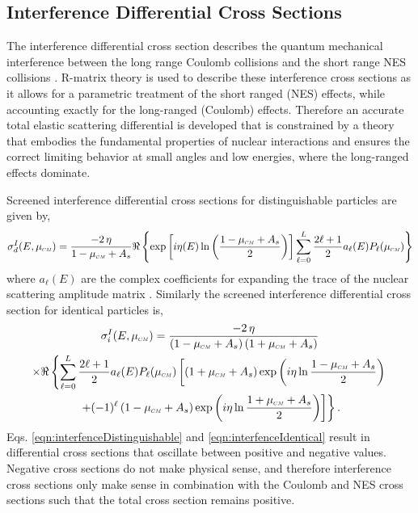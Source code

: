 \subsection{Interference Differential Cross Sections}
The interference differential cross section describes the quantum mechanical interference between the long range Coulomb collisions and the short range NES collisions \cite{Hale-1983}. R-matrix theory is used to describe these interference cross sections as it allows for a parametric treatment of the short ranged (NES) effects, while accounting exactly for the long-ranged (Coulomb) effects. Therefore an accurate total elastic scattering differential is developed that is constrained by a theory that embodies the fundamental properties of nuclear interactions and ensures the correct limiting behavior at small angles and low energies, where the long-ranged effects dominate.

Screened interference differential cross sections for distinguishable particles are given by,
\begin{equation} \label{eqn:interfenceDistinguishable}
    \sigma_d^I(E,\mucm) = \dfrac{-2 \, \eta}{1 - \mucm + A_s} \Re \left\lbrace \exp \left[ i \eta(E) \ln \left( \dfrac{1 - \mucm + A_s}{2} \right) \right]\sum\limits_{\ell = 0}^L \dfrac{2\ell + 1}{2} a_{\ell}(E) P_{\ell}(\mucm) \right\rbrace
\end{equation}
where $a_{\ell}(E)$ are the complex coefficients for expanding the trace of the nuclear scattering amplitude matrix \cite{Brown-2018}. Similarly the screened interference differential cross section for identical particles is,
\begin{multline} \label{eqn:interfenceIdentical}
    \sigma_i^I(E,\mucm) = \dfrac{-2 \, \eta}{\left(1 - \mucm + A_s\right)\left(1 + \mucm + A_s\right)} \\
    \times \Re \left\lbrace \sum\limits_{\ell = 0}^L \dfrac{2 \ell + 1}{2} a_{\ell}(E) P_{\ell}(\mucm) \left[ \left(1 + \mucm + A_s \right) \exp\left(i \eta \ln \dfrac{1 - \mucm + A_s}{2}\right) \right.\right. \\ \left.\left. + (-1)^{\ell} \left(1 - \mucm + A_s \right) \exp\left(i \eta \ln \dfrac{1 + \mucm + A_s}{2}\right) \right]\right\rbrace.
\end{multline}
Eqs. \eqref{eqn:interfenceDistinguishable} and \eqref{eqn:interfenceIdentical} result in differential cross sections that oscillate between positive and negative values. Negative cross sections do not make physical sense, and therefore interference cross sections only make sense in combination with the Coulomb and NES cross sections such that the total cross section remains positive.

